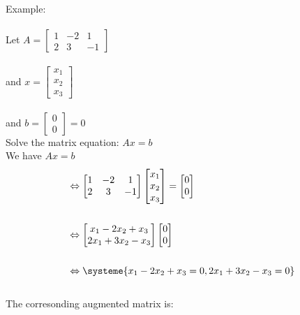 \documentclass{jhwhw}
\begin{document}
Example:\\ \\
Let \(A = \begin{bmatrix} 1 & -2 & 1 \\ 2 & 3 & -1 \end{bmatrix}\)\\ \\

and \(x = \begin{bmatrix}  x_1 \\ x_2 \\ x_3 \end{bmatrix}\)\\ \\

and \(b = \begin{bmatrix} 0 \\ 0 \end{bmatrix} = 0\)
\\

Solve the matrix equation: \(Ax = b\)\\

We have \(Ax = b\)
\begin{align*} &\Leftrightarrow \begin{bmatrix} 1 & -2 & 1 \\  2 & 3 & -1 \end{bmatrix}\begin{bmatrix}  x_1 \\ x_2 \\ x_3 \end{bmatrix} = \begin{bmatrix} 0 \\ 0 \end{bmatrix}\\ \\
&\Leftrightarrow \begin{bmatrix} x_1 - 2x_2 + x_3 \\ 2x_1 +3x_2 - x_3 \end{bmatrix} \begin{bmatrix} 0 \\ 0 \end{bmatrix}\\ \\
&\Leftrightarrow \systeme{x_1-2x_2+x_3=0, 2x_1 + 3x_2 - x_3 = 0}
\end{align*}
\\

The corresonding augmented matrix is:
\\
\end{document}
